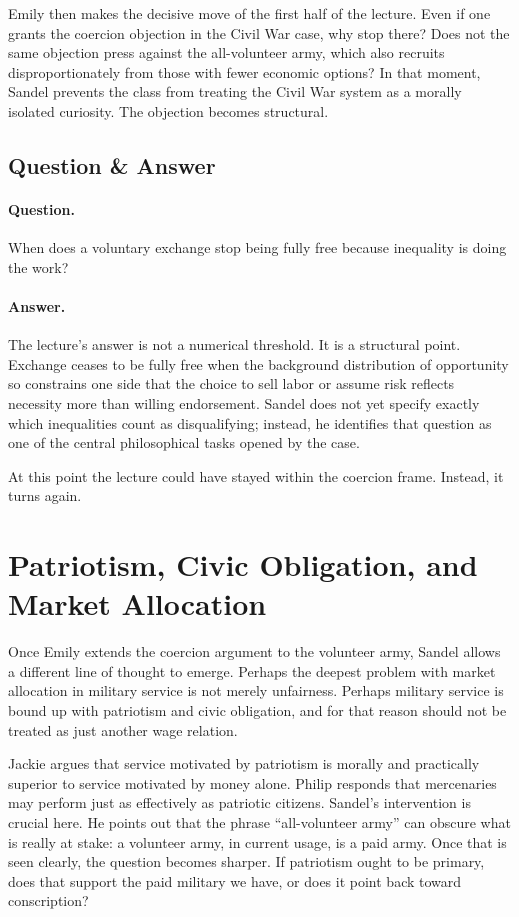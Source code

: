 Emily then makes the decisive move of the first half of the lecture. Even if one grants the coercion objection in the Civil War case, why stop there? Does not the same objection press against the all-volunteer army, which also recruits disproportionately from those with fewer economic options? In that moment, Sandel prevents the class from treating the Civil War system as a morally isolated curiosity. The objection becomes structural.

\subsection{Question \& Answer}

\paragraph{Question.} When does a voluntary exchange stop being fully free because inequality is doing the work?

\paragraph{Answer.} The lecture's answer is not a numerical threshold. It is a structural point. Exchange ceases to be fully free when the background distribution of opportunity so constrains one side that the choice to sell labor or assume risk reflects necessity more than willing endorsement. Sandel does not yet specify exactly which inequalities count as disqualifying; instead, he identifies that question as one of the central philosophical tasks opened by the case.

At this point the lecture could have stayed within the coercion frame. Instead, it turns again.

\section{Patriotism, Civic Obligation, and Market Allocation}

Once Emily extends the coercion argument to the volunteer army, Sandel allows a different line of thought to emerge. Perhaps the deepest problem with market allocation in military service is not merely unfairness. Perhaps military service is bound up with patriotism and civic obligation, and for that reason should not be treated as just another wage relation.

Jackie argues that service motivated by patriotism is morally and practically superior to service motivated by money alone. Philip responds that mercenaries may perform just as effectively as patriotic citizens. Sandel's intervention is crucial here. He points out that the phrase ``all-volunteer army'' can obscure what is really at stake: a volunteer army, in current usage, is a paid army. Once that is seen clearly, the question becomes sharper. If patriotism ought to be primary, does that support the paid military we have, or does it point back toward conscription?

